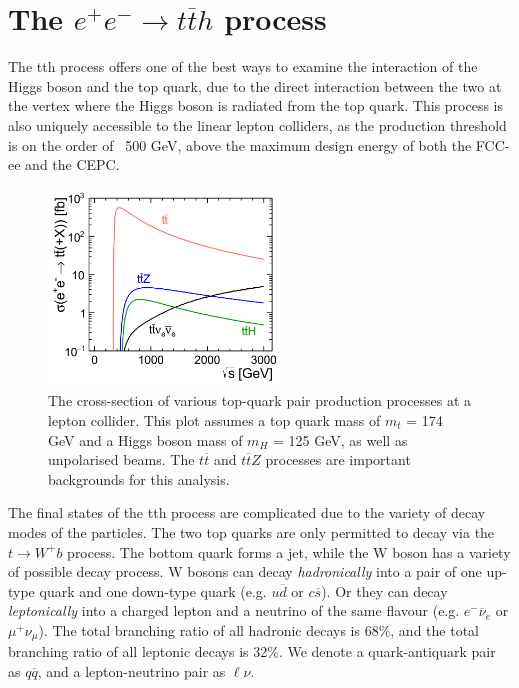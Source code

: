 \section{The $e^+ e^- \rightarrow t\overline{t}h$ process}

The tth process offers one of the best ways to examine the interaction of the Higgs boson and the top quark, due to the direct interaction between the two at the vertex where the Higgs boson is radiated from the top quark. This process is also uniquely accessible to the linear lepton colliders, as the production threshold is on the order of ~500 GeV, above the maximum design energy of both the \acrshort{FCC}-ee and the \acrshort{CEPC}.

\begin{figure}[h]
	\centering
	\includegraphics[width=0.55\textwidth]{../Pictures/Analysis/tt-production-crosssection.png}
	\caption{The cross-section of various top-quark pair production processes at a lepton collider. This plot assumes a top quark mass of $m_t$ = 174 GeV and a Higgs boson mass of $m_H$ = 125 GeV, as well as unpolarised beams. The $t\overline{t}$ and $t\overline{t}Z$ processes are important backgrounds for this analysis.}
	\label{figure:analysis/leptons/track-energy}
\end{figure}

The final states of the tth process are complicated due to the variety of decay modes of the particles. The two top quarks are only permitted to decay via the $t \rightarrow W^+ b $ process. The bottom quark forms a jet, while the W boson has a variety of possible decay process. W bosons can decay \textit{hadronically} into a pair of one up-type quark and one down-type quark (e.g. $u\overline{d}$ or $c\overline{s}$). Or they can decay \textit{leptonically} into a charged lepton and a neutrino of the same flavour (e.g. $e^- \overline{\nu}_e$ or $\mu^+ \nu_\mu$). The total branching ratio of all hadronic decays is 68\%, and the total branching ratio of all leptonic decays is 32\%. We denote a quark-antiquark pair as $q\overline{q}$, and a lepton-neutrino pair as $\ell \nu$.

